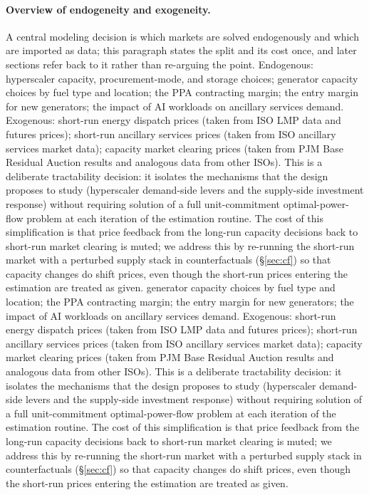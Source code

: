 \documentclass[12pt,letterpaper]{article}
\begin{document}
\paragraph{Overview of endogeneity and exogeneity.} A central modeling decision
is which markets are solved endogenously and which are imported as data; this
paragraph states the split and its cost once, and later sections refer back to
it rather than re-arguing the point.
Endogenous: hyperscaler capacity, procurement-mode, and storage choices;
generator capacity choices by fuel type and location; the PPA contracting
margin; the entry margin for new generators; the impact of AI workloads on
ancillary services demand. Exogenous: short-run energy dispatch prices (taken
from ISO LMP data and futures prices); short-run ancillary services prices
(taken from ISO ancillary services market data); capacity market clearing
prices (taken from PJM Base Residual Auction results and analogous data from
other ISOs). This is a deliberate tractability decision: it isolates the
mechanisms that the design proposes to study (hyperscaler demand-side levers
and the supply-side investment response) without requiring solution of a
full unit-commitment optimal-power-flow problem at each iteration of the
estimation routine. The cost of this simplification is that price feedback
from the long-run capacity decisions back to short-run market clearing is
muted; we address this by re-running the short-run market with a perturbed
supply stack in counterfactuals (\S\ref{sec:cf}) so that capacity changes do
shift prices, even though the short-run prices entering the estimation are
treated as given.
generator capacity choices by fuel type and location; the PPA contracting
margin; the entry margin for new generators; the impact of AI workloads on
ancillary services demand. Exogenous: short-run energy dispatch prices (taken
from ISO LMP data and futures prices); short-run ancillary services prices
(taken from ISO ancillary services market data); capacity market clearing
prices (taken from PJM Base Residual Auction results and analogous data from
other ISOs). This is a deliberate tractability decision: it isolates the
mechanisms that the design proposes to study (hyperscaler demand-side levers
and the supply-side investment response) without requiring solution of a
full unit-commitment optimal-power-flow problem at each iteration of the
estimation routine. The cost of this simplification is that price feedback
from the long-run capacity decisions back to short-run market clearing is
muted; we address this by re-running the short-run market with a perturbed
supply stack in counterfactuals (\S\ref{sec:cf}) so that capacity changes do
shift prices, even though the short-run prices entering the estimation are
treated as given.
\end{document}
